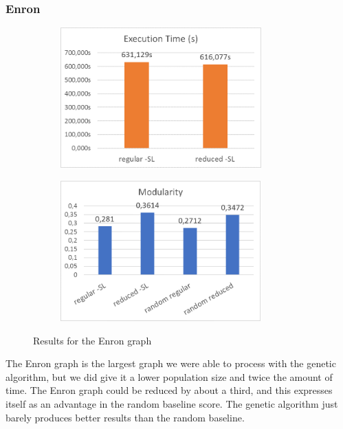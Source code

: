\subsubsection{Enron}
\begin{figure}[H]
\begin{center}
    \begin{subfigure}{0.47\textwidth}
    \begin{center}
    \includegraphics[height=5.4cm]{images/enrontime.png}
    \end{center}
    \end{subfigure}
    \begin{subfigure}{0.47\textwidth}
    \begin{center}
    \includegraphics[height=5.4cm]{images/enronfitness.png}
    \end{center}
    \end{subfigure}
\caption{Results for the Enron graph}\label{fig:enron}
\end{center}
\end{figure}
The Enron graph is the largest graph we were able to process with the genetic algorithm, but we did give it a lower population size and twice the amount of time. The Enron graph could be reduced by about a third, and this expresses itself as an advantage in the random baseline score. The genetic algorithm just barely produces better results than the random baseline.

